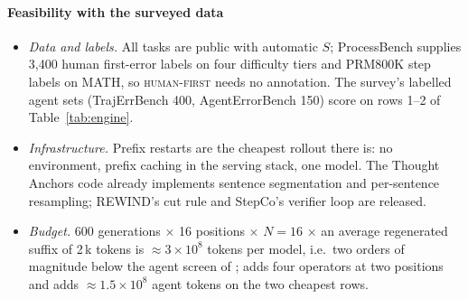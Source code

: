 \documentclass[10pt,a4paper]{article}
\begin{document}
\paragraph{Feasibility with the surveyed data}
\begin{itemize}[leftmargin=1.1em]
\item \emph{Data and labels.} All tasks are public with automatic $S$; ProcessBench supplies 3,400 human first-error labels on four difficulty tiers and PRM800K step labels on MATH, so \textsc{human-first} needs no annotation. The survey's labelled agent sets (TrajErrBench 400, AgentErrorBench 150) score  on rows 1--2 of Table~\ref{tab:engine}.
\item \emph{Infrastructure.} Prefix restarts are the cheapest rollout there is: no environment, prefix caching in the serving stack, one model. The Thought Anchors code \cite{bogdan2025thoughtanchors} already implements sentence segmentation and per-sentence resampling; REWIND's cut rule and StepCo's verifier loop are released.
\item \emph{Budget.} 600 generations $\times$ 16 positions $\times$ $N=16$ $\times$ an average regenerated suffix of 2\,k tokens is $\approx3\times10^8$ tokens per model, i.e.\ two orders of magnitude below the agent screen of ;  adds four operators at two positions and  adds $\approx1.5\times10^8$ agent tokens on the two cheapest rows.
\end{itemize}
\end{document}
